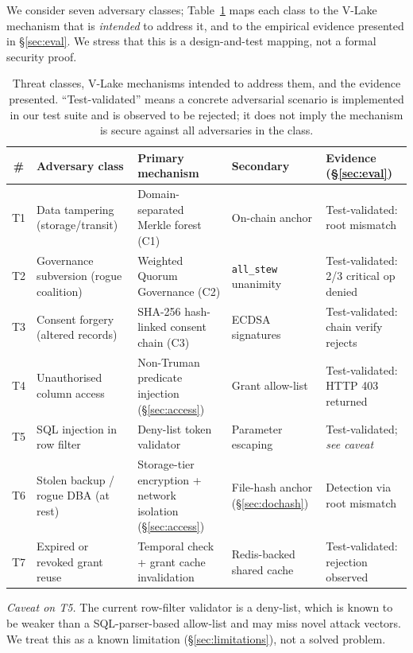 \documentclass[10pt,twocolumn]{article}
\begin{document}
We consider seven adversary classes; Table~\ref{tab:threat-matrix}
maps each class to the V-Lake mechanism that is \emph{intended}
to address it, and to the empirical evidence presented in
\S\ref{sec:eval}. We stress that this is a design-and-test mapping,
not a formal security proof.

\begin{table}[t]
\centering
\footnotesize
\caption{Threat classes, V-Lake mechanisms intended to address them,
and the evidence presented. ``Test-validated'' means a concrete
adversarial scenario is implemented in our test suite and is
observed to be rejected; it does not imply the mechanism is secure
against all adversaries in the class.}
\label{tab:threat-matrix}
\setlength{\tabcolsep}{4pt}
\begin{tabular}{@{}c p{3.6cm} p{4.0cm} p{2.8cm} p{3.6cm}@{}}
\toprule
\textbf{\#} & \textbf{Adversary class} & \textbf{Primary mechanism}
  & \textbf{Secondary} & \textbf{Evidence (\S\ref{sec:eval})} \\
\midrule
T1 & Data tampering (storage/transit)
   & Domain-separated Merkle forest (C1)
   & On-chain anchor
   & Test-validated: root mismatch \\
T2 & Governance subversion (rogue coalition)
   & Weighted Quorum Governance (C2)
   & \texttt{all\_stew} unanimity
   & Test-validated: 2/3 critical op denied \\
T3 & Consent forgery (altered records)
   & SHA-256 hash-linked consent chain (C3)
   & ECDSA signatures
   & Test-validated: chain verify rejects \\
T4 & Unauthorised column access
   & Non-Truman predicate injection (\S\ref{sec:access})
   & Grant allow-list
   & Test-validated: HTTP 403 returned \\
T5 & SQL injection in row filter
   & Deny-list token validator
   & Parameter escaping
   & Test-validated; \emph{see caveat} \\
T6 & Stolen backup / rogue DBA (at rest)
   & Storage-tier encryption + network isolation
     (\S\ref{sec:access})
   & File-hash anchor (\S\ref{sec:dochash})
   & Detection via root mismatch \\
T7 & Expired or revoked grant reuse
   & Temporal check + grant cache invalidation
   & Redis-backed shared cache
   & Test-validated: rejection observed \\
\bottomrule
\end{tabular}
\end{table}

\noindent
\emph{Caveat on T5.} The current row-filter validator is a
deny-list, which is known to be weaker than a SQL-parser-based
allow-list and may miss novel attack vectors. We treat this as a
known limitation (\S\ref{sec:limitations}), not a solved problem.
\end{document}
